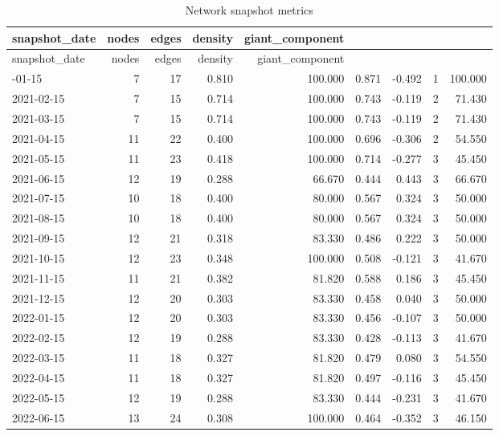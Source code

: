 \begin{longtable}{lrrrrrrrr}
\caption{Network snapshot metrics} \label{tab:network_metrics} \\
\toprule
snapshot_date & nodes & edges & density & giant_component%
\midrule
\endfirsthead
\caption[]{Network snapshot metrics} \\
\toprule
snapshot_date & nodes & edges & density & giant_component%
\midrule
\endhead
\midrule
\multicolumn{9}{r}{Continued on next page} \\
\midrule
\endfoot
\bottomrule
\endlastfoot
2021-01-15 & 7 & 17 & 0.810 & 100.000 & 0.871 & -0.492 & 1 & 100.000 \\
2021-02-15 & 7 & 15 & 0.714 & 100.000 & 0.743 & -0.119 & 2 & 71.430 \\
2021-03-15 & 7 & 15 & 0.714 & 100.000 & 0.743 & -0.119 & 2 & 71.430 \\
2021-04-15 & 11 & 22 & 0.400 & 100.000 & 0.696 & -0.306 & 2 & 54.550 \\
2021-05-15 & 11 & 23 & 0.418 & 100.000 & 0.714 & -0.277 & 3 & 45.450 \\
2021-06-15 & 12 & 19 & 0.288 & 66.670 & 0.444 & 0.443 & 3 & 66.670 \\
2021-07-15 & 10 & 18 & 0.400 & 80.000 & 0.567 & 0.324 & 3 & 50.000 \\
2021-08-15 & 10 & 18 & 0.400 & 80.000 & 0.567 & 0.324 & 3 & 50.000 \\
2021-09-15 & 12 & 21 & 0.318 & 83.330 & 0.486 & 0.222 & 3 & 50.000 \\
2021-10-15 & 12 & 23 & 0.348 & 100.000 & 0.508 & -0.121 & 3 & 41.670 \\
2021-11-15 & 11 & 21 & 0.382 & 81.820 & 0.588 & 0.186 & 3 & 45.450 \\
2021-12-15 & 12 & 20 & 0.303 & 83.330 & 0.458 & 0.040 & 3 & 50.000 \\
2022-01-15 & 12 & 20 & 0.303 & 83.330 & 0.456 & -0.107 & 3 & 50.000 \\
2022-02-15 & 12 & 19 & 0.288 & 83.330 & 0.428 & -0.113 & 3 & 41.670 \\
2022-03-15 & 11 & 18 & 0.327 & 81.820 & 0.479 & 0.080 & 3 & 54.550 \\
2022-04-15 & 11 & 18 & 0.327 & 81.820 & 0.497 & -0.116 & 3 & 45.450 \\
2022-05-15 & 12 & 19 & 0.288 & 83.330 & 0.444 & -0.231 & 3 & 41.670 \\
2022-06-15 & 13 & 24 & 0.308 & 100.000 & 0.464 & -0.352 & 3 & 46.150 \\
\end{longtable}
